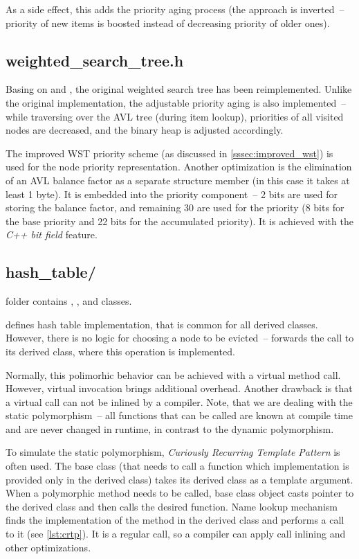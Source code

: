 As a side effect, this adds the priority aging process (the approach is inverted~-- priority of new items is boosted instead of decreasing priority of older ones).

\subsection{weighted\_search\_tree.h}
Basing on \cite{park90} and \cite{park94}, the original weighted search tree has been reimplemented. Unlike the original implementation, the adjustable priority aging is also implemented~-- while traversing over the AVL tree (during item lookup), priorities of all visited nodes are decreased, and the binary heap is adjusted accordingly.

The improved WST priority scheme (as discussed in \cref{sssec:improved_wst}) is used for the node priority representation. Another optimization is the elimination of an AVL balance factor as a separate structure member (in this case it takes at least 1 byte). It is embedded into the priority component~-- 2 bits are used for storing the balance factor, and remaining 30 are used for the priority (8 bits for the base priority and 22 bits for the accumulated priority). It is achieved with the \emph{C++ bit field} feature.

\subsection{hash\_table/}

 folder contains , , and  classes.

 defines hash table implementation, that is common for all derived classes. However, there is no logic for choosing a node to be evicted~--  forwards the call to its derived class, where this operation is implemented.

Normally, this polimorhic behavior can be achieved with a virtual method call. However, virtual invocation brings additional overhead. Another drawback is that a virtual call can not be inlined by a compiler. Note, that we are dealing with the static polymorphism~-- all functions that can be called are known at compile time and are never changed in runtime, in contrast to the dynamic polymorphism.

To simulate the static polymorphism, \emph{Curiously Recurring Template Pattern} is often used\cite{crtp}. The base class (that needs to call a function which implementation is provided only in the derived class) takes its derived class as a template argument. When a polymorphic method needs to be called, base class object casts  pointer to the derived class and then calls the desired function. Name lookup mechanism finds the implementation of the method in the derived class and performs a call to it (see \cref{lst:crtp}). It is a regular call, so a compiler can apply call inlining and other optimizations.

